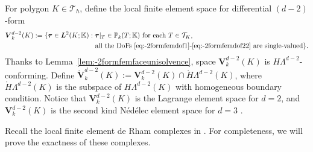 \documentclass[10pt]{amsart}
\newcommand{\bs}{\boldsymbol}
\numberwithin{equation}{section}
\begin{document}
For polygon $K\in \mathcal T_h$, define the local finite element space for differential $(d-2)$-form  
\begin{align*}  
\boldsymbol{V}_{k}^{d-2}(K):=\{\boldsymbol{\tau}\in\bs L^2(K;\mathbb K)&: \boldsymbol{\tau}|_{T}\in \mathbb P_{k}(T;\mathbb K) \textrm{ for each } T\in\mathcal T_K, \\
&\;\;\textrm{ all the DoFs \eqref{eq:-2formfemdof1}-\eqref{eq:-2formfemdof22} are single-valued}\}.
\end{align*}
Thanks to Lemma~\ref{lem:-2formfemfaceunisolvence}, space $\boldsymbol{V}_{k}^{d-2}(K)$ is $H\Lambda^{d-2}$-conforming.
Define $\mathring{\boldsymbol{V}}_{k}^{d-2}(K):=\boldsymbol{V}_{k}^{d-2}(K)\cap \mathring{H}\Lambda^{d-2}(K)$, where $\mathring{H}\Lambda^{d-2}(K)$ is the subspace of $H\Lambda^{d-2}(K)$ with homogeneous boundary condition.
Notice that
 $\boldsymbol{V}_{k}^{d-2}(K)$ is the Lagrange element space for $d=2$,
and $\boldsymbol{V}_{k}^{d-2}(K)$ is the second kind N\'ed\'elec element space for $d=3$ \cite{Nedelec:1986family}. 

Recall the local finite element de Rham complexes in \cite{ArnoldFalkWinther2006,Arnold2018}.
For completeness, we will prove the exactness of these complexes.
\end{document}
